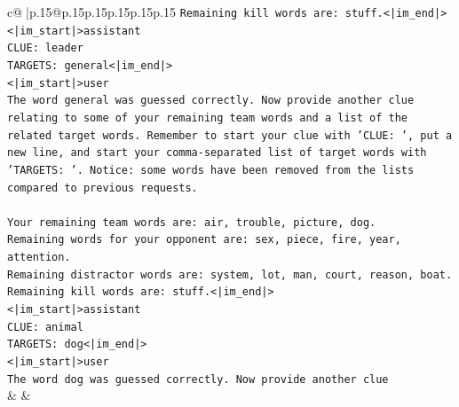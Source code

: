 \documentclass{article}
\begin{document}
{\begin{supertabular}{c@{$\;$}|p{.15\linewidth}@{}p{.15\linewidth}p{.15\linewidth}p{.15\linewidth}p{.15\linewidth}p{.15\linewidth}}
{{{\texttt{Remaining kill words are: stuff.<|im\_end|>} \\
\texttt{<|im\_start|>assistant} \\
\texttt{CLUE: leader} \\
\texttt{TARGETS: general<|im\_end|>} \\
\texttt{<|im\_start|>user} \\
\texttt{The word general was guessed correctly. Now provide another clue relating to some of your remaining team words and a list of the related target words. Remember to start your clue with 'CLUE: ', put a new line, and start your comma{-}separated list of target words with 'TARGETS: '. Notice: some words have been removed from the lists compared to previous requests.} \\
\\ 
\texttt{Your remaining team words are: air, trouble, picture, dog.} \\
\texttt{Remaining words for your opponent are: sex, piece, fire, year, attention.} \\
\texttt{Remaining distractor words are: system, lot, man, court, reason, boat.} \\
\texttt{Remaining kill words are: stuff.<|im\_end|>} \\
\texttt{<|im\_start|>assistant} \\
\texttt{CLUE: animal} \\
\texttt{TARGETS: dog<|im\_end|>} \\
\texttt{<|im\_start|>user} \\
\texttt{The word dog was guessed correctly. Now provide another clue} \\
            }
        }
    }
    & & \\ \\


\end{supertabular}}
\end{document}
